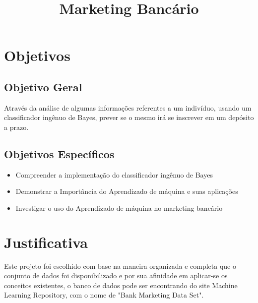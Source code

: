 \documentclass[conference]{IEEEtran}
\begin{document}
\title{Marketing Bancário}

\author{
\and
{}
\and
{}

}

\maketitle





\section{Objetivos}
\subsection{Objetivo Geral}
Através da análise de algumas informações referentes a um indivíduo, usando um classificador ingênuo de Bayes, prever se o mesmo irá se inscrever em um depósito a prazo. 
\subsection{Objetivos Específicos}
\begin{itemize}
\item Compreender a implementação do classificador ingênuo de Bayes
\item Demonstrar a Importância do Aprendizado de máquina e suas aplicações
\item Investigar o uso do Aprendizado de máquina no marketing bancário
\end{itemize}
\section{Justificativa}
Este projeto foi escolhido com base na maneira organizada e completa que o conjunto de dados  foi disponibilizado e por sua afinidade em aplicar-se os conceitos existentes, o banco de dados pode ser encontrando do site Machine Learning Repository, com o nome de "Bank Marketing Data Set"\cite{b1}.
\end{document}

